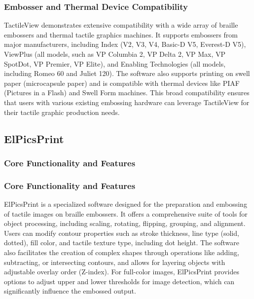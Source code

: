 \subsubsection{Embosser and Thermal Device Compatibility}

TactileView demonstrates extensive compatibility with a wide array of braille embossers and thermal tactile graphics machines. It supports embossers from major manufacturers, including Index (V2, V3, V4, Basic-D V5, Everest-D V5), ViewPlus (all models, such as VP Columbia 2, VP Delta 2, VP Max, VP SpotDot, VP Premier, VP Elite), and Enabling Technologies (all models, including Romeo 60 and Juliet 120). \cite{DuxburyDetails,BlindSVG} The software also supports printing on swell paper (microcapsule paper) and is compatible with thermal devices like PIAF (Pictures in a Flash) and Swell Form machines. \cite{DuxburyDetails} This broad compatibility ensures that users with various existing embossing hardware can leverage TactileView for their tactile graphic production needs.

\subsection{ElPicsPrint}

\subsubsection{Core Functionality and Features}

\subsubsection{Core Functionality and Features}

ElPicsPrint is a specialized software designed for the preparation and embossing of tactile images on braille embossers. \cite{TactileViewIrie} It offers a comprehensive suite of tools for object processing, including scaling, rotating, flipping, grouping, and alignment. \cite{TactileViewIrie} Users can modify contour properties such as stroke thickness, line type (solid, dotted), fill color, and tactile texture type, including dot height. \cite{TactileViewIrie} The software also facilitates the creation of complex shapes through operations like adding, subtracting, or intersecting contours, and allows for layering objects with adjustable overlay order (Z-index). \cite{TactileViewIrie} For full-color images, ElPicsPrint provides options to adjust upper and lower thresholds for image detection, which can significantly influence the embossed output. \cite{TactileViewIrie}

